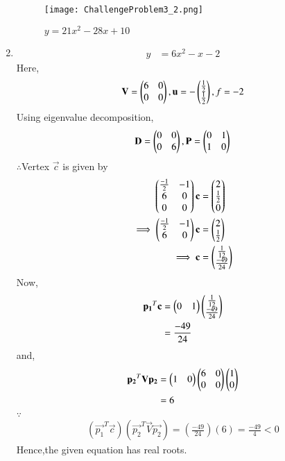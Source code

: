 \documentclass[journal,12pt,twocolumn]{IEEEtran}
\begin{document}
\begin{enumerate}
    \begin{figure}[!ht]
    \centering
    \texttt{[image: ChallengeProblem3\_2.png]}
    \caption{$y=21x^2-28x+10$}
    \label{ex1}	
    \end{figure}
    
    \item
    \begin{align}
        y &= 6x^2-x-2
    \end{align}
    Here,
    \begin{align}
        \mathbf{V} = \begin{pmatrix}6 & 0 \\ 0 & 0\end{pmatrix},\mathbf{u}=-\begin{pmatrix}\frac{1}{2} \\ \frac{1}{2}\end{pmatrix},f=-2
    \end{align}
    Using eigenvalue decomposition,
    \begin{align}
        \mathbf{D} = \begin{pmatrix}0 & 0\\0 & 6\end{pmatrix} ,\mathbf{P}=\begin{pmatrix}0 & 1\\1 & 0\end{pmatrix}
    \end{align}
    $\therefore$Vertex $\vec{c}$ is given by
    \begin{align}
        \begin{pmatrix}\frac{-1}{2} & -1 \\ 6 & 0 \\ 0 & 0\end{pmatrix}\mathbf{c} &= \begin{pmatrix}2 \\ \frac{1}{2} \\ 0\end{pmatrix} \\
        \implies  \begin{pmatrix}\frac{-1}{2} & -1 \\ 6 & 0\end{pmatrix}\mathbf{c} &= \begin{pmatrix}2 \\ \frac{1}{2}\end{pmatrix}
        \\
        \implies \mathbf{c} &= \begin{pmatrix}\frac{1}{12} \\ \frac{-49}{24}\end{pmatrix}
    \end{align}
    Now,
    \begin{align}
        \mathbf{p_1}^T\mathbf{c} &= \begin{pmatrix}0 & 1\end{pmatrix}\begin{pmatrix}\frac{1}{12} \\ \frac{-49}{24}\end{pmatrix}
        \\
        &= \frac{-49}{24}
    \end{align}
    and,
    \begin{align}
        \mathbf{p_2}^T\mathbf{V}\mathbf{p_2} &= \begin{pmatrix}1 & 0\end{pmatrix}\begin{pmatrix}6 & 0\\0& 0\end{pmatrix}\begin{pmatrix}1 \\ 0\end{pmatrix}
        \\
        &= 6
    \end{align}
    $\because$
    \begin{align}
    (\vec{p_1}^T\vec{c})(\vec{p_2}^T\vec{V}\vec{p_2}) = (\frac{-49}{24})(6) = \frac{-49}{4}<0
    \end{align}
    Hence,the given equation has real roots.
    

\end{enumerate}
\end{document}
